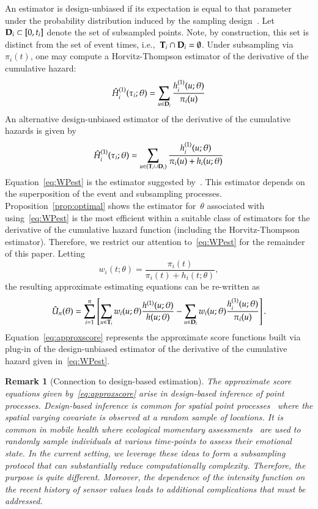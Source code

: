 \documentclass[12pt]{amsart}
\newtheorem{rmk}[thm]{Remark}%
\def\bfT{{\bf T}}
\def\bfD{{\bf D}}
\begin{document}
An estimator is design-unbiased if its expectation is equal to that parameter under the probability distribution induced by the sampling design~\citep{Cassel1977}. Let~$\bfD_i \subset [0,t_i]$ denote the set of subsampled points.  Note, by construction, this set is distinct from the set of event times, i.e.,~$\bfT_i \cap \bfD_i = \emptyset$.  Under subsampling via $\pi_i (t)$, one may compute a Horvitz-Thompson estimator of the derivative of the cumulative hazard:
\[
\hat H_{i}^{(1)} (\tau_i; \theta) = \sum_{u \in \bfD_i} \frac{
  h^{(1)}_i (u; \theta) }{ \pi_i (u) }
\]
An alternative design-unbiased estimator of the derivative of the cumulative hazards is given by
\begin{equation}
\label{eq:WPest}
\hat H_{i}^{(1)} (\tau_i; \theta) = \sum_{u \in (\bfT_i \cup \bfD_i)}
\frac{ h^{(1)}_i ( u; \theta ) }{ \pi_i (u) + h_i ( u ; \theta) }
\end{equation}
Equation~\eqref{eq:WPest} is the estimator suggested by~\cite{Waagepetersen2008}.  This estimator depends on the superposition of the event and subsampling processes. Proposition~\ref{prop:optimal} shows the estimator for~$\theta$ associated with using~\eqref{eq:WPest} is the most efficient within a suitable class of estimators for the derivative of the cumulative hazard function (including the Horvitz-Thompson estimator). Therefore, we restrict our attention to~\eqref{eq:WPest} for the remainder of this paper. Letting
\begin{equation}
\label{eq:waage_weights}
w_i (t; \theta) = \frac{\pi_i (t)}{\pi_i (t) + h_i (t ; \theta)},
\end{equation}
the resulting approximate estimating equations can be re-written as
\begin{equation}
\label{eq:approxscore}
\hat{U}_n (\theta) = \sum_{i=1}^n \left[ \sum_{u \in \bfT_i} w_i(u; \theta)
  \frac{h^{(1)} (u; \theta)}{ h ( u; \theta)}  - \sum_{u \in \bfD_i} w_i(u;
  \theta) \frac{h_i^{(1)} (u; \theta)}{ \pi_i (u) } \right].
\end{equation}
Equation~\eqref{eq:approxscore} represents the approximate score functions built via plug-in of the design-unbiased estimator of the derivative of the cumulative hazard given in~\eqref{eq:WPest}.

\begin{rmk}[Connection to design-based estimation]
The approximate score equations given by~\eqref{eq:approxscore} arise in design-based inference of point processes.  Design-based inference is common for spatial point processes~\citep{Waagepetersen2008} where the spatial varying covariate is observed at a random sample of locations. It is common in mobile health where ecological momentary assessments~\citep{Rathbun2012,Rathbun2016} are used to randomly sample individuals at various time-points to assess their emotional state.  In the current setting, we leverage these ideas to form a subsampling protocol that can substantially reduce computationally complexity.  Therefore, the purpose is quite different. Moreover, the dependence of the intensity function on the recent history of sensor values leads to additional complications that must be addressed.
\end{rmk}
\end{document}
